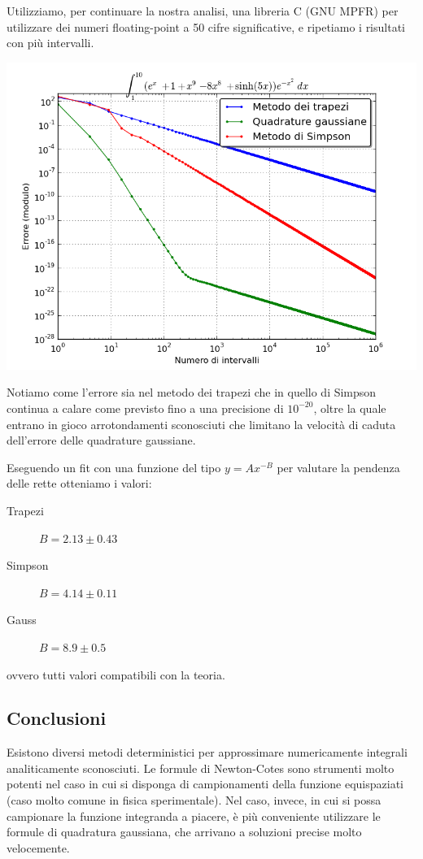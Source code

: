 \documentclass[a4paper,10pt]{article}
\begin{document}
Utilizziamo, per continuare la nostra analisi, una libreria C (GNU MPFR) per utilizzare dei numeri floating-point a 50 cifre significative, e ripetiamo i risultati con più intervalli.

\begin{center}
\includegraphics[scale=0.5]{../images/integrali/integralibigprecision-longrun.png}
\end{center}

Notiamo come l'errore sia nel metodo dei trapezi che in quello di Simpson continua a calare come previsto fino a una precisione di $10^{-20}$, oltre la quale entrano in gioco arrotondamenti sconosciuti che limitano la velocità di caduta dell'errore delle quadrature gaussiane.

Eseguendo un fit con una funzione del tipo $y = Ax^{-B}$ per valutare la pendenza delle rette otteniamo i valori:
\begin{description}
\item[Trapezi] $B=2.13 \pm 0.43$
\item[Simpson] $B=4.14 \pm 0.11$
\item[Gauss] $B=8.9 \pm 0.5$
\end{description}

ovvero tutti valori compatibili con la teoria.

\subsection{Conclusioni}

Esistono diversi metodi deterministici per approssimare numericamente integrali analiticamente sconosciuti. Le formule di Newton-Cotes sono strumenti molto potenti nel caso in cui si disponga di campionamenti della funzione equispaziati (caso molto comune in fisica sperimentale). Nel caso, invece, in cui si possa campionare la funzione integranda a piacere, è più conveniente utilizzare le formule di quadratura gaussiana, che arrivano a soluzioni precise molto velocemente.
\end{document}
